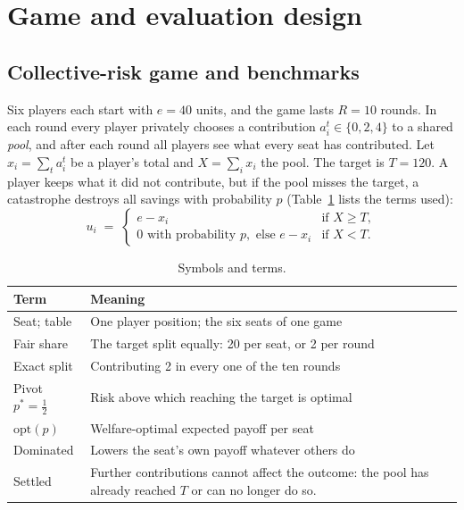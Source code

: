 \documentclass[sigconf,anonymous]{aamas}
\newcommand{\popt}{p^{*}}
\begin{document}
\section{Game and evaluation design}
\label{sec:game}

\subsection{Collective-risk game and benchmarks}
\label{sec:rules}
Six players each start with $e=40$ units, and the game lasts $R=10$ rounds. In each round every player privately chooses a contribution $a_i^t\in\{0,2,4\}$ to a shared \emph{pool}, and after each round all players see what every seat has contributed. Let $x_i=\sum_t a_i^t$ be a player's total and $X=\sum_i x_i$ the pool. The target is $T=120$. A player keeps what it did not contribute, but if the pool misses the target, a catastrophe destroys all savings with probability $p$ (Table~\ref{tab:terms} lists the terms used):
\begin{equation}
u_i \;=\;
\begin{cases}
e-x_i & \text{if } X\ge T,\\
0 \text{ with probability } p, \text{ else } e-x_i & \text{if } X<T.
\end{cases}
\label{eq:payoff}
\end{equation}

\begin{table}[t]
\caption{Symbols and terms.}
\label{tab:terms}
\small
\setlength{\tabcolsep}{3pt}
\begin{tabular}{@{}>{\raggedright\arraybackslash}p{}>{\raggedright\arraybackslash}p{}@{}}
\toprule
Term & Meaning \\
\midrule
Seat; table & One player position; the six seats of one game \\
Fair share & The target split equally: 20 per seat, or 2 per round \\
Exact split & Contributing  2 in every one of the ten rounds \\
Pivot $\popt=\tfrac12$ & Risk above which reaching the target is optimal \\
$\mathrm{opt}(p)$ & Welfare-optimal expected payoff per seat \\
Dominated & Lowers the seat's own payoff whatever others do \\
Settled & Further contributions cannot affect the outcome: the pool has already reached $T$ or can no longer do so. \\
\bottomrule
\end{tabular}
\end{table}
\end{document}
